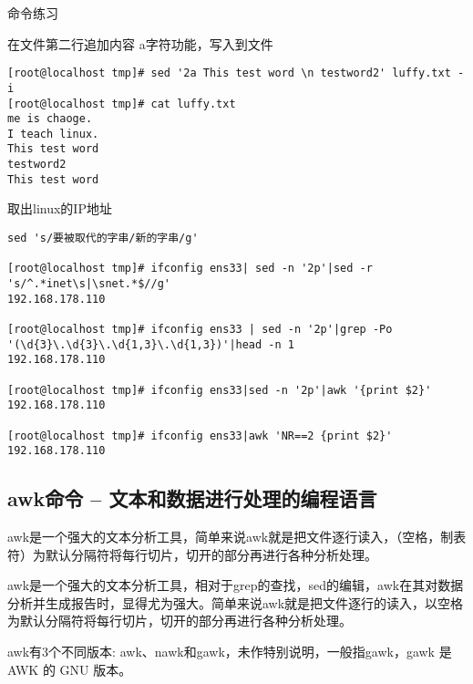 \begin{ascolorbox10}{命令练习}
\begin{ascboxJ}{在文件第二行追加内容 a字符功能，写入到文件}
\begin{lstlisting}[style=linux]
[root@localhost tmp]# sed '2a This test word \n testword2' luffy.txt -i
[root@localhost tmp]# cat luffy.txt
me is chaoge.
I teach linux.
This test word
testword2
This test word
		\end{lstlisting}
	\end{ascboxJ}
	\begin{ascboxJ}{取出linux的IP地址}

		\begin{lstlisting}[style=linux]
sed 's/要被取代的字串/新的字串/g'
			
[root@localhost tmp]# ifconfig ens33| sed -n '2p'|sed -r 's/^.*inet\s|\snet.*$//g'
192.168.178.110

[root@localhost tmp]# ifconfig ens33 | sed -n '2p'|grep -Po '(\d{3}\.\d{3}\.\d{1,3}\.\d{1,3})'|head -n 1
192.168.178.110

[root@localhost tmp]# ifconfig ens33|sed -n '2p'|awk '{print $2}'
192.168.178.110

[root@localhost tmp]# ifconfig ens33|awk 'NR==2 {print $2}'
192.168.178.110
		\end{lstlisting}
	\end{ascboxJ}
\end{ascolorbox10}

\subsection{awk命令 – 文本和数据进行处理的编程语言}
awk是一个强大的文本分析工具，简单来说awk就是把文件逐行读入，（空格，制表符）为默认分隔符将每行切片，切开的部分再进行各种分析处理。

awk是一个强大的文本分析工具，相对于grep的查找，sed的编辑，awk在其对数据分析并生成报告时，显得尤为强大。简单来说awk就是把文件逐行的读入，以空格为默认分隔符将每行切片，切开的部分再进行各种分析处理。

awk有3个不同版本: awk、nawk和gawk，未作特别说明，一般指gawk，gawk 是 AWK 的 GNU 版本。

